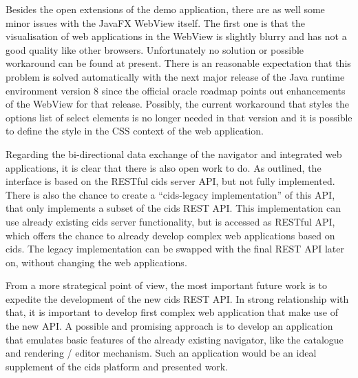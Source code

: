 Besides the open extensions of the demo application, there are as well some minor issues with the JavaFX WebView itself. 
The first one is that the visualisation of web applications in the WebView is slightly blurry and has not a good quality like other browsers. 
Unfortunately no solution or possible workaround can be found at present. There is an reasonable expectation that this problem is solved automatically with the next major release of the Java runtime environment version 8 since the official oracle roadmap points out enhancements of the WebView for that release. 
Possibly, the current workaround that styles the options list of select elements is no longer needed in that version and it is possible to define the style in the CSS context of the web application.
   
Regarding the bi-directional data exchange of the navigator and integrated web applications, it is clear that there is also open work to do. 
As outlined, the interface is based on the RESTful cids server API, but not fully implemented. 
There is also the chance to create a \enquote{cids-legacy implementation} of this API, that only implements a subset of the cids REST API. 
This implementation can use already existing cids server functionality, but is accessed as RESTful API, which offers the chance to already develop complex web applications based on cids. 
The legacy implementation can be swapped with the final REST API later on, without changing the web applications.

From a more strategical point of view, the most important future work is to expedite the development of the new cids REST API. 
In strong relationship with that, it is important to develop first complex web application that make use of the new API. 
A possible and promising approach is to develop an application that emulates basic features of the already existing navigator, like the catalogue and rendering / editor mechanism. 
Such an application would be an ideal supplement of the cids platform and presented work.
 
